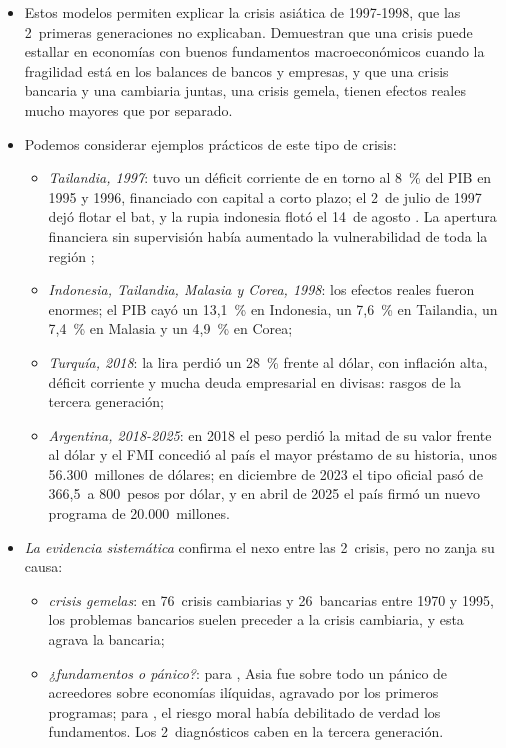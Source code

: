 \documentclass[11pt]{article}
\begin{document}
\begin{itemize}
\item Estos modelos permiten explicar la crisis asiática de 1997-1998, que las 2~primeras generaciones no explicaban. Demuestran que una crisis puede estallar en economías con buenos fundamentos macroeconómicos cuando la fragilidad está en los balances de bancos y empresas, y que una crisis bancaria y una cambiaria juntas, una crisis gemela, tienen efectos reales mucho mayores que por separado.
\item Podemos considerar ejemplos prácticos de este tipo de crisis:
  \begin{itemize}
  \item \emph{Tailandia, 1997}: tuvo un déficit corriente de en torno al 8~\% del PIB en 1995 y 1996, financiado con capital a corto plazo; el 2~de julio de 1997 dejó flotar el bat, y la rupia indonesia flotó el 14~de agosto\nocite{FMI1997WEOdic} . La apertura financiera sin supervisión había aumentado la vulnerabilidad de toda la región ;
  \item \emph{Indonesia, Tailandia, Malasia y Corea, 1998}: los efectos reales fueron enormes; el PIB cayó un 13,1~\% en Indonesia, un 7,6~\% en Tailandia, un 7,4~\% en Malasia y un 4,9~\% en Corea\nocite{FMI2026WEOdatos,BM2026WDIcrecimiento};
  \item \emph{Turquía, 2018}: la lira perdió un 28~\% frente al dólar, con inflación alta, déficit corriente y mucha deuda empresarial en divisas: rasgos de la tercera generación\nocite{BCE2026EXR,BIS2026XRU};
  \item \emph{Argentina, 2018-2025}: en 2018 el peso perdió la mitad de su valor frente al dólar y el FMI concedió al país el mayor préstamo de su historia, unos 56.300~millones de dólares\nocite{FMI2018PR395}; en diciembre de 2023 el tipo oficial pasó de 366,5~a 800~pesos por dólar\nocite{BIS2026XRU}, y en abril de 2025 el país firmó un nuevo programa de 20.000~millones\nocite{FMI2025PR101}.
  \end{itemize}
\item \emph{La evidencia sistemática} confirma el nexo entre las 2~crisis, pero no zanja su causa:
  \begin{itemize}
  \item \emph{crisis gemelas}: en 76~crisis cambiarias y 26~bancarias entre 1970 y 1995, los problemas bancarios suelen preceder a la crisis cambiaria, y esta agrava la bancaria\nocite{KaminskyReinhart1999};
  \item \emph{¿fundamentos o pánico?}: para \textcite{RadeletSachs1998East}, Asia fue sobre todo un pánico de acreedores sobre economías ilíquidas, agravado por los primeros programas; para \textcite{CPR1999PaperTigers}, el riesgo moral había debilitado de verdad los fundamentos. Los 2~diagnósticos caben en la tercera generación.
  \end{itemize}
\end{itemize}
\end{document}
